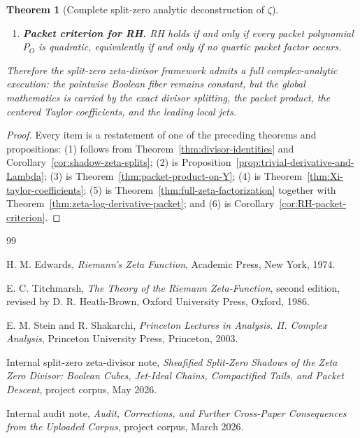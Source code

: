 \documentclass[11pt,a4paper]{article}
\newtheorem{theorem}{Theorem}[section]
\theoremstyle{definition}
\theoremstyle{remark}
\begin{document}
\begin{theorem}[Complete split-zero analytic deconstruction of $\zeta$]
\begin{enumerate}[label=(\arabic*)]
\item \textbf{Packet criterion for RH.}
RH holds if and only if every packet polynomial $P_O$ is quadratic, equivalently if and only if no quartic packet factor occurs.
\end{enumerate}

Therefore the split-zero zeta-divisor framework admits a full complex-analytic execution: the pointwise Boolean fiber remains constant, but the global mathematics is carried by the exact divisor splitting, the packet product, the centered Taylor coefficients, and the leading local jets.
\end{theorem}

\begin{proof}
Every item is a restatement of one of the preceding theorems and propositions:
(1) follows from Theorem~\ref{thm:divisor-identities} and Corollary~\ref{cor:shadow-zeta-splits};
(2) is Proposition~\ref{prop:trivial-derivative-and-Lambda};
(3) is Theorem~\ref{thm:packet-product-on-Y};
(4) is Theorem~\ref{thm:Xi-taylor-coefficients};
(5) is Theorem~\ref{thm:full-zeta-factorization} together with Theorem~\ref{thm:zeta-log-derivative-packet}; and
(6) is Corollary~\ref{cor:RH-packet-criterion}.
\end{proof}

\begin{thebibliography}{99}

H. M. Edwards,
\emph{Riemann's Zeta Function},
Academic Press, New York, 1974.

E. C. Titchmarsh,
\emph{The Theory of the Riemann Zeta-Function},
second edition, revised by D. R. Heath-Brown,
Oxford University Press, Oxford, 1986.

E. M. Stein and R. Shakarchi,
\emph{Princeton Lectures in Analysis. II. Complex Analysis},
Princeton University Press, Princeton, 2003.

Internal split-zero zeta-divisor note,
\emph{Sheafified Split-Zero Shadows of the Zeta Zero Divisor: Boolean Cubes, Jet-Ideal Chains, Compactified Tails, and Packet Descent},
project corpus, May 2026.

Internal audit note,
\emph{Audit, Corrections, and Further Cross-Paper Consequences from the Uploaded Corpus},
project corpus, March 2026.

\end{thebibliography}
\end{document}
